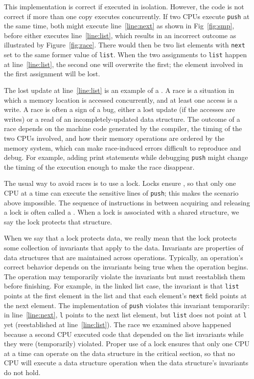 This implementation is correct if executed in isolation.
However, the code is not correct if more than one
copy executes concurrently.
If two CPUs execute
\lstinline{push}
at the same time,
both might execute line~\ref{line:next} as shown in Fig~\ref{fig:smp},
before either executes line~\ref{line:list}, which results
in an incorrect outcome as illustrated by Figure~\ref{fig:race}.
There would then be two
list elements with
\lstinline{next}
set to the same former value of
\lstinline{list}.
When the two assignments to
\lstinline{list}
happen at line~\ref{line:list},
the second one will overwrite the first;
the element involved in the first assignment
will be lost.

The lost update at line~\ref{line:list} is an example of a
.
A race is a situation in which a memory location is accessed
concurrently, and at least one access is a write.
A race is often a sign of a bug, either a lost update
(if the accesses are writes) or a read of
an incompletely-updated data structure.
The outcome of a race depends on
the machine code generated by the compiler,
the timing of the two CPUs involved,
and how their memory operations are ordered by the memory system,
which can make race-induced errors difficult to reproduce
and debug.
For example, adding print statements while debugging
\lstinline{push}
might change the timing of the execution enough
to make the race disappear.

The usual way to avoid races is to use a lock.
Locks ensure
,
so that only one CPU at a time can execute
the sensitive lines of
\lstinline{push};
this makes the scenario above impossible.
The sequence of instructions in between acquiring and releasing a lock
is often called a
.
When a lock is associated with a shared structure, we say the lock
protects that structure.

When we say that a lock protects data, we really mean
that the lock protects some collection of invariants
that apply to the data.
Invariants are properties of data structures that
are maintained across operations.
Typically, an operation's correct behavior depends
on the invariants being true when the operation
begins. The operation may temporarily violate
the invariants but must reestablish them before
finishing.
For example, in the linked list case, the invariant is that
\lstinline{list}
points at the first element in the list
and that each element's
\lstinline{next}
field points at the next element.
The implementation of
\lstinline{push}
violates this invariant temporarily: in line~\ref{line:next},
\lstinline{l}
points
to the next list element, but
\lstinline{list}
does not point at
\lstinline{l}
yet (reestablished at line~\ref{line:list}).
The race we examined above
happened because a second CPU executed
code that depended on the list invariants
while they were (temporarily) violated.
Proper use of a lock ensures that only one CPU at a time
can operate on the data structure in the critical section, so that
no CPU will execute a data structure operation when the
data structure's invariants do not hold.

